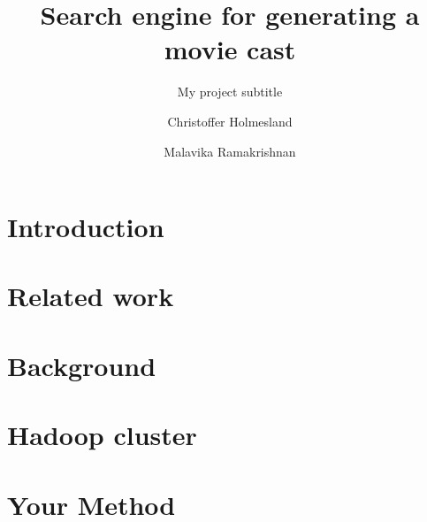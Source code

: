 \documentclass[sigconf]{acmart}
\begin{document}
\title{Search engine for generating a movie cast}
\subtitle{My project subtitle}

\author{Christoffer Holmesland}

\author{Malavika Ramakrishnan}




\begin{abstract}

\end{abstract}


\maketitle


\section{Introduction}
\label{sec:introduction}


\section{Related work}
\label{sec:relatedwork}


\section{Background}
\label{sec:background}


\section{Hadoop cluster}
\label{sec:hadoop}


\section{Your Method}
\label{sec:method}

\end{document}
